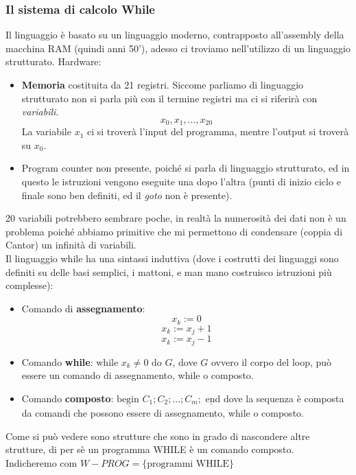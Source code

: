 \documentclass{article}
\begin{document}
\subsubsection{Il sistema di calcolo While}
Il linguaggio è basato su un linguaggio moderno, contrapposto all'assembly della macchina RAM (quindi
anni 50'), adesso ci troviamo nell'utilizzo di un linguaggio strutturato.
\newline\newline
Hardware:
\begin{itemize}
    \item \textbf{Memoria} costituita da 21 registri. Siccome parliamo di linguaggio strutturato
          non si parla più con il termine registri ma ci si riferirà con \textit{variabili}.
          $$x_0,x_1,...,x_{20}$$
          La variabile $x_1$ ci si troverà l'input del programma, mentre
          l'output si troverà su $x_0$.
    \item Program counter non presente, poiché si parla di linguaggio strutturato, ed in questo
          le istruzioni vengono eseguite una dopo l'altra (punti di inizio ciclo e finale
          sono ben definiti, ed il \textit{goto} non è presente).
\end{itemize}
20 variabili potrebbero sembrare poche, in realtà la numerosità dei dati non è un problema
poiché abbiamo primitive che mi permettono di condensare (coppia di Cantor) un infinità
di variabili.\\Il linguaggio while ha una sintassi induttiva (dove i costrutti dei linguaggi
sono definiti su delle basi semplici, i mattoni, e man mano costruisco istruzioni più
complesse):
\begin{itemize}
    \item Comando di \textbf{assegnamento}:
    $$x_k:=0$$
    $$x_k:=x_j+1$$
    $$x_k:=x_j-1$$
    \item Comando \textbf{while}: $\text{while }x_k\neq 0\text{ do } G$, dove $G$
          ovvero il corpo del loop, può essere un comando di assegnamento, while o composto.
    \item Comando \textbf{composto}: $\underline{\text{begin }}C_1; C_2; ...;C_m;
              \underline{\text{ end}}$ dove la sequenza è composta da comandi che possono essere
          di assegnamento, while o composto.
\end{itemize}
Come si può vedere sono strutture che sono in grado di nascondere altre strutture, di per sè
un programma WHILE è un comando composto.\\Indicheremo com $W-PROG=\{\text{programmi WHILE}\}$
\end{document}
